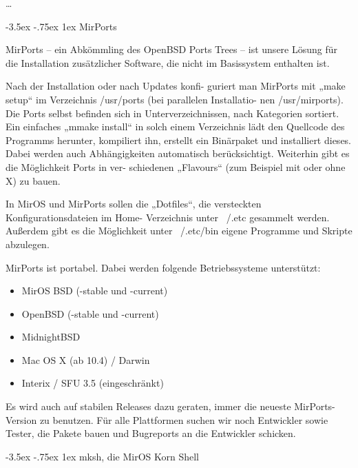 \documentclass[
a4paper,landscape,%
notumble%
]{leaflet}
\makeatletter
\newcommand{\sectbox}[1]{%
 \noindent\protect\colorbox{yellow}{%
 \@tempdima=\hsize
 \advance\@tempdima by-2\fboxsep
 \advance\@tempdima by-2\fboxrule
 \protect\parbox{\@tempdima}{%
 \medskip
 \raggedright %
 #1 \medskip
}}}
\renewcommand\section{\@startsection{section}{1}{1em}%
  {-3.5ex \@plus -.75ex}%
  {1ex} %
  {\normalfont\Large\itshape\sectbox}}
\makeatother
\begin{document}
\newpage

{\centering\dots}

\newpage

\section{MirPorts}

MirPorts -- ein Abkömmling des OpenBSD Ports Trees -- ist unsere Lösung für die Installation zusätzlicher Software, die nicht im Basissystem enthalten ist.

Nach der Installation oder nach Updates konfi- guriert man MirPorts mit „make setup“ im Verzeichnis /usr/ports (bei parallelen Installatio- nen /usr/mirports). Die Ports selbst befinden sich in Unterverzeichnissen, nach Kategorien sortiert. Ein einfaches „mmake install“ in solch einem Verzeichnis lädt den Quellcode des Programms herunter, kompiliert ihn, erstellt ein Binärpaket und installiert dieses. Dabei werden auch Abhängigkeiten automatisch berücksichtigt. Weiterhin gibt es die Möglichkeit Ports in ver- schiedenen „Flavours“ (zum Beispiel mit oder ohne X) zu bauen.

In MirOS und MirPorts sollen die „Dotfiles“, die versteckten Konfigurationsdateien im Home- Verzeichnis unter ~/.etc gesammelt werden. Außerdem gibt es die Möglichkeit unter ~/.etc/bin eigene Programme und Skripte abzulegen.

MirPorts ist portabel. Dabei werden folgende Betriebssysteme unterstützt:

\begin{itemize}
\item MirOS BSD (-stable und -current)
\item OpenBSD (-stable und -current)
\item MidnightBSD
\item Mac OS X (ab 10.4) / Darwin
\item Interix / SFU 3.5 (eingeschränkt)
\end{itemize}

Es wird auch auf stabilen Releases dazu geraten, immer die neueste MirPorts-Version zu benutzen. Für alle Plattformen suchen wir noch Entwickler sowie Tester, die Pakete bauen und Bugreports an die Entwickler schicken.

\newpage

\section{mksh, die MirOS Korn Shell}
\end{document}
